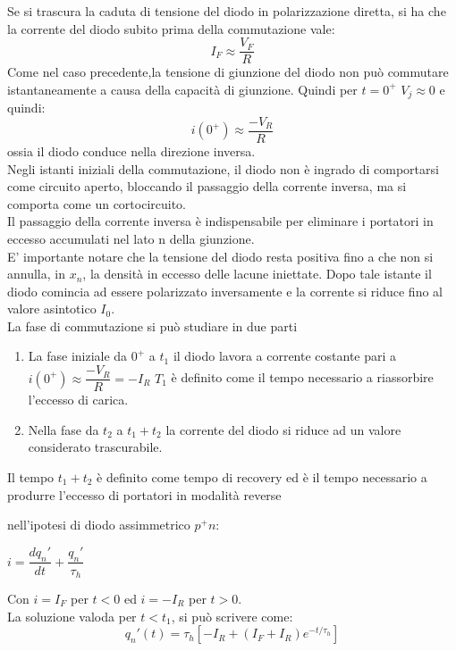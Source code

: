 Se si trascura la caduta di tensione del diodo in polarizzazione diretta, si ha che la corrente del diodo subito prima della commutazione vale:
\begin{equation}
    I_F \approx \dfrac{V_F}{R}
\end{equation}
Come nel caso precedente,la tensione di giunzione del diodo non può commutare istantaneamente a causa della capacità di giunzione. Quindi per $t=0^+$ $V_j \approx 0$ e quindi:
\begin{equation}
    i(0^+) \approx \dfrac{-V_R}{R} 
\end{equation}
ossia il diodo conduce nella direzione inversa.\\
Negli istanti iniziali della commutazione, il diodo non è ingrado di comportarsi come circuito aperto, bloccando il passaggio della corrente inversa, ma si comporta come un cortocircuito.\\
Il passaggio della corrente inversa è indispensabile per eliminare i portatori in eccesso accumulati nel lato n della giunzione.\\
E' importante notare che la tensione del diodo resta positiva fino a che non si annulla, in $x_n$, la densità in eccesso delle lacune iniettate. Dopo tale istante il diodo comincia ad essere polarizzato inversamente e la corrente si riduce fino al valore asintotico $I_0$.\\
La fase di commutazione si può studiare in due parti
\begin{enumerate}
    \item La fase iniziale da $0^+$ a $t_1$ il diodo lavora a corrente costante pari a $i(0^+) \approx \dfrac{-V_R}{R}=-I_R$
$T_1$ è definito come il tempo necessario a riassorbire l'eccesso di carica.
    \item Nella fase da $t_2$ a $t_1+t_2$ la corrente del diodo si riduce ad un valore considerato trascurabile.
\end{enumerate}
Il tempo $t_1+t_2$ è definito come tempo di recovery ed è il tempo necessario a produrre l'eccesso di portatori in modalità reverse 
\begin{exbox}
    nell'ipotesi di diodo assimmetrico $p^+n$:
     \begin{center}
         $i=\dfrac{dq_n'}{dt}+\dfrac{q_n'}{\tau_h}$
     \end{center}
    Con $i=I_F$ per $t<0$ ed $i=-I_R$ per $t>0$.\\
    La soluzione valoda per $t<t_1$, si può scrivere come:
    \begin{equation}
        q_n'(t)=\tau_h \left[ -I_R + (I_F+I_R)e^{-t/\tau_h} \right]
    \end{equation}
\end{exbox}

